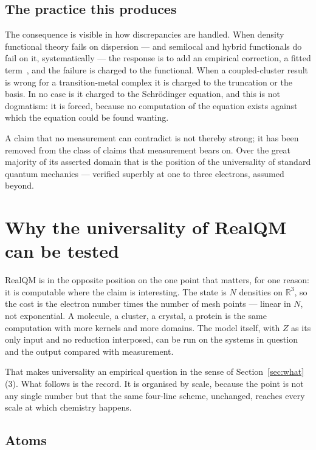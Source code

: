\documentclass[11pt]{article}
\begin{document}
\subsection{The practice this produces}

The consequence is visible in how discrepancies are handled. When density functional theory fails
on dispersion --- and semilocal and hybrid functionals do fail on it, systematically --- the
response is to add an empirical correction, a fitted term~\cite{Grimme2010}, and the failure is
charged to the functional. When a coupled-cluster result is wrong for a transition-metal complex it is charged
to the truncation or the basis. In no case is it charged to the Schr\"odinger equation, and this
is not dogmatism: it is forced, because no computation of the equation exists against which the
equation could be found wanting.

A claim that no measurement can contradict is not thereby strong; it has been removed from the
class of claims that measurement bears on. Over the great majority of its asserted domain that is
the position of the universality of standard quantum mechanics --- verified superbly at one to
three electrons, assumed beyond.

\section{Why the universality of RealQM can be tested}\label{sec:realqm}

RealQM is in the opposite position on the one point that matters, for one reason: it is computable
where the claim is interesting. The state is $N$ densities on $\mathbb{R}^3$, so the cost is the
electron number times the number of mesh points --- linear in $N$, not exponential. A molecule, a
cluster, a crystal, a protein is the same computation with more kernels and more domains. The
model itself, with $Z$ as its only input and no reduction interposed, can be run on the systems in
question and the output compared with measurement.

That makes universality an empirical question in the sense of Section~\ref{sec:what}(3). What
follows is the record. It is organised by scale, because the point is not any single number but
that the same four-line scheme, unchanged, reaches every scale at which chemistry happens.

\subsection{Atoms}
\end{document}
